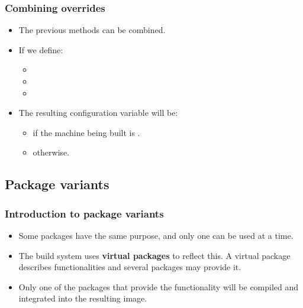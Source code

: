 \begin{frame}
  \frametitle{Combining overrides}
  \begin{itemize}
    \item The previous methods can be combined.
    \item If we define:
      \begin{itemize}
        \item {}
        \item {}
        \item {}
      \end{itemize}
    \item The resulting configuration variable will be:
      \begin{itemize}
        \item {} if the machine being built is
          .
        \item {}
          otherwise.
      \end{itemize}
  \end{itemize}
\end{frame}

\subsection{Package variants}

\begin{frame}
  \frametitle{Introduction to package variants}
  \begin{itemize}
    \item Some packages have the same purpose, and only one can be
      used at a time.
    \item The build system uses {\bf virtual packages} to reflect
      this. A virtual package describes functionalities and several
      packages may provide it.
    \item Only one of the packages that provide the functionality will
    be compiled and integrated into the resulting image.
  \end{itemize}
\end{frame}

